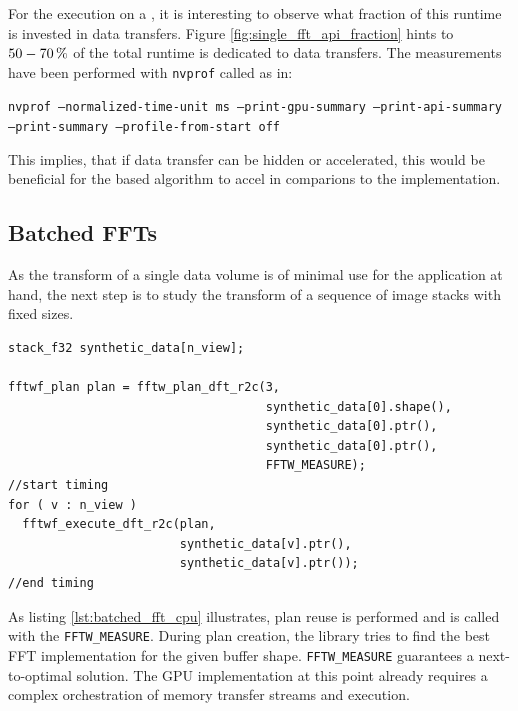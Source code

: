 For the execution on a \gpu{}, it is interesting to observe what fraction of this runtime is invested in data transfers. Figure \ref{fig:single_fft_api_fraction} hints to $\unit[50-70]{\%}$ of the total runtime is dedicated to data transfers. The measurements have been performed with \texttt{nvprof} called as in:\newline
\begin{center}
  \texttt{nvprof --normalized-time-unit ms --print-gpu-summary --print-api-summary --print-summary --profile-from-start off}\newline
\end{center}
This implies, that if data transfer can be hidden or accelerated, this would be beneficial for the \gpu{} based algorithm to accel in comparions to the \cpu{} implementation.

\subsection{Batched FFTs}
As the transform of a single data volume is of minimal use for the application at hand, the next step is to study the transform of a sequence of image stacks with fixed sizes.

\begin{lstlisting}[caption={Batched FFT on synthetic data performed on CPU in pseudo-code based on the \fftw{} syntax.},label={lst:batched_fft_cpu}]
stack_f32 synthetic_data[n_view];

fftwf_plan plan = fftw_plan_dft_r2c(3,
                                    synthetic_data[0].shape(),
                                    synthetic_data[0].ptr(),
                                    synthetic_data[0].ptr(),
                                    FFTW_MEASURE);
//start timing
for ( v : n_view )
  fftwf_execute_dft_r2c(plan, 
                        synthetic_data[v].ptr(),
                        synthetic_data[v].ptr());
//end timing
\end{lstlisting}

As listing \ref{lst:batched_fft_cpu} illustrates, plan reuse is performed and \fftw{} is called with the \texttt{FFTW_MEASURE}. During plan creation, the \fftw{} library tries to find the best FFT implementation for the given buffer shape. \texttt{FFTW_MEASURE} guarantees a next-to-optimal solution. The GPU implementation at this point already requires a complex orchestration of memory transfer streams and execution.

